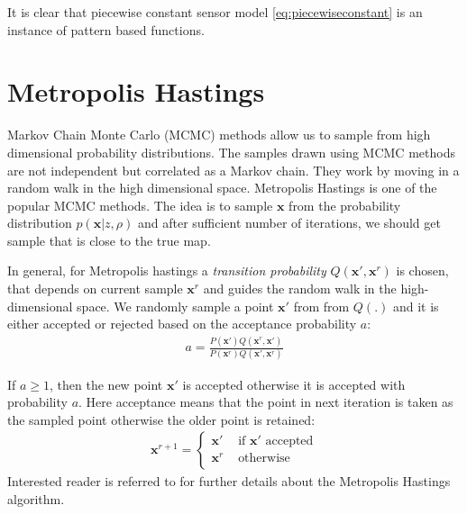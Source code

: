 \documentclass[letterpaper, 10 pt, conference]{ieeeconf} %
\newcommand{\vect}[1]{\mathbf{#1}}
\begin{document}
It is clear that piecewise constant sensor model \eqref{eq:piecewiseconstant}
is an instance of pattern based functions.

\section{Metropolis Hastings}
Markov Chain Monte Carlo (MCMC) methods allow us to sample from high dimensional probability distributions. The samples drawn using MCMC methods are not independent but correlated as a Markov chain. They work by moving in a random walk in the high dimensional space. Metropolis Hastings is one of the popular MCMC methods. The idea is to sample $\vect{x}$ from the probability distribution $p(\vect{x}|z, \rho)$ and after sufficient number of iterations, we should get sample that is close to the true map.

In general, for Metropolis hastings a \emph{transition probability} $Q(\vect{x}',
\vect{x}^r)$ is chosen, that depends on current sample $\vect{x}^r$ and guides
the random walk in the high-dimensional space. We randomly sample a point
$\vect{x}'$ from from $Q(.)$ and it is either accepted or rejected based on the
acceptance probability $a$:
\begin{align}
  a = \frac{P(\vect{x}')Q(\vect{x}^r, \vect{x}')}
  {P(\vect{x}^r)Q(\vect{x}', \vect{x}^r)}
\end{align}

If $a \ge 1$, then the new point $\vect{x}'$ is accepted otherwise it is accepted with probability $a$. Here acceptance means that the point in next iteration is taken as the sampled point otherwise the older point is retained:
\begin{align}
  \vect{x}^{r+1} = \begin{cases}
    \vect{x}' & \text{ if $\vect{x}'$ accepted}\\
    \vect{x}^r & \text{ otherwise}\\
  \end{cases}
\end{align}
Interested reader is referred to \cite{mackay1998introduction} for further details about the Metropolis Hastings algorithm.
\end{document}
